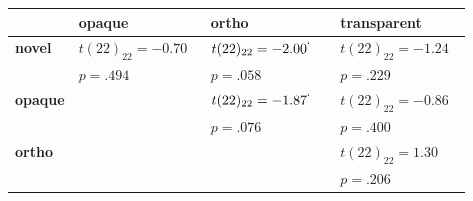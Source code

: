 \begin{center}
\begin{tabular}{llll}
\toprule
 & opaque & ortho & transparent \\
\midrule
\textbf{novel} & $t(22)_{22}=-0.70^{    \ \ \ \ }$ & $t(22)_{22}=-2.00^{`   \ \ \ }$ & $t(22)_{22}=-1.24^{    \ \ \ \ }$ \\
 & $p=.494$ & $p=.058$ & $p=.229$ \\
\textbf{opaque} &  & $t(22)_{22}=-1.87^{`   \ \ \ }$ & $t(22)_{22}=-0.86^{    \ \ \ \ }$ \\
 &  & $p=.076$ & $p=.400$ \\
\textbf{ortho} &  &  & $t(22)_{22}=1.30^{    \ \ \ \ }$ \\
 &  &  & $p=.206$ \\
\bottomrule
\end{tabular}
\end{center}